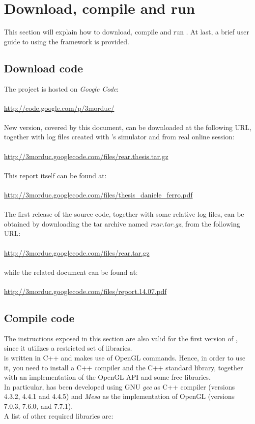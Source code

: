 \section{Download, compile and run \framework{}}
\label{sourcecode:downloadrun}

This section will explain how to download, compile and
run \framework{}. At last, a brief user guide to using the
framework is provided.

\subsection{Download code}
\label{sourcecode:downloadrun:download}

The \framework{} project is hosted on \textit{Google Code}:
\\
\\
\url{http://code.google.com/p/3morduc/}
\\
\\
New \framework{} version, covered by this document,
can be downloaded at the following URL, together with
log files created with \morduc{}'s simulator and from
real \morduc{} online session:
\\
\\
\url{http://3morduc.googlecode.com/files/rear.thesis.tar.gz}
\\
\\
This report itself can be found at:
\\
\\
\url{http://3morduc.googlecode.com/files/thesis_daniele_ferro.pdf}
\\
\\
The first release of the source code, together with
some relative log files, can be obtained by downloading
the tar archive named \textit{rear.tar.gz}, from the
following URL:
\\
\\
\url{http://3morduc.googlecode.com/files/rear.tar.gz}
\\
\\
while the related document can be found at:
\\
\\
\url{http://3morduc.googlecode.com/files/report.14.07.pdf}

\subsection{Compile code}
\label{sourcecode:downloadrun:compile}

The instructions exposed in this section are also valid for the
first version of \framework{}, since it utilizes a restricted
set of libraries.
\\
\framework{} is written in C++ and makes use of OpenGL commands.
Hence, in order to use it, you need to install a C++ compiler and the
C++ standard library, together with an implementation of the OpenGL
API and some free libraries.
\\
In particular, \framework{} has been developed using GNU \textit{gcc} as
C++ compiler (versions 4.3.2, 4.4.1 and 4.4.5) and \textit{Mesa} as the
implementation
of OpenGL (versions 7.0.3, 7.6.0, and 7.7.1).
\\
A list of other required libraries are:

